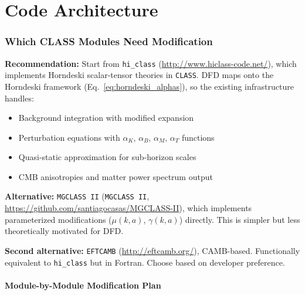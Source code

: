 \documentclass[11pt,a4paper]{article}
\newcommand{\CLASS}{\texttt{CLASS}}
\newcommand{\hiclass}{\texttt{hi\_class}}
\newcommand{\MGCLASS}{\texttt{MGCLASS~II}}
\begin{document}
\part{Code Architecture}
\label{part:architecture}

\section{Which CLASS Modules Need Modification}
\label{sec:architecture}

\begin{tcolorbox}[colback=blue!3!white, colframe=blue!60!black,
  title=\textbf{Finding \thesection: \hiclass{} Is the Optimal Starting
  Point}\label{find:architecture}]

\textbf{Recommendation:} Start from \hiclass{}
(\url{http://www.hiclass-code.net/}), which implements Horndeski
scalar-tensor theories in \CLASS{}. DFD maps onto the Horndeski
framework (Eq.~\eqref{eq:horndeski_alphas}), so the existing
infrastructure handles:
\begin{itemize}[nosep]
\item Background integration with modified expansion
\item Perturbation equations with $\alpha_K$, $\alpha_B$,
  $\alpha_M$, $\alpha_T$ functions
\item Quasi-static approximation for sub-horizon scales
\item CMB anisotropies and matter power spectrum output
\end{itemize}

\textbf{Alternative:} \MGCLASS{} (\texttt{MGCLASS II},
\url{https://github.com/santiagocasas/MGCLASS-II}), which implements
parameterized modifications ($\mu(k,a)$, $\gamma(k,a)$) directly.
This is simpler but less theoretically motivated for DFD.

\textbf{Second alternative:} \texttt{EFTCAMB}
(\url{http://eftcamb.org/}), CAMB-based. Functionally equivalent to
\hiclass{} but in Fortran. Choose based on developer preference.

\end{tcolorbox}

\subsection{Module-by-Module Modification Plan}
\end{document}
